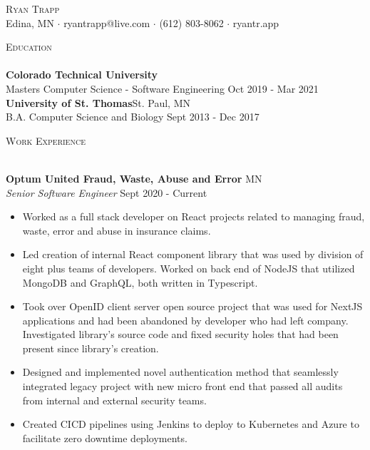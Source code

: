 \documentclass[a4paper]{article}
\newcommand{\lineunder} {
    \vspace*{-8pt} \\
    \hspace*{-18pt} \hrulefill \\
}
\newcommand{\header} [1] {
    {\hspace*{-18pt}\vspace*{6pt} \textsc{#1}}
    \vspace*{-6pt} \lineunder
}
\begin{document}
\vspace*{-40pt}

    

\vspace*{-10pt}
\begin{center}
	{\Huge \scshape {Ryan Trapp}}\\
	Edina, MN $\cdot$ ryantrapp@live.com $\cdot$ (612) 803-8062 $\cdot$ ryantr.app\\
\end{center}

\header{Education}
\textbf{Colorado Technical University}\\
Masters Computer Science - Software Engineering \hfill Oct 2019 - Mar 2021\\
\vspace{2mm}
\textbf{University of St. Thomas}\hfill St. Paul, MN\\
B.A. Computer Science and Biology \hfill Sept 2013 - Dec 2017\\
\vspace{2mm}

\header{Work Experience}
\vspace{1mm}

\textbf{Optum United Fraud, Waste, Abuse and Error} \hfill MN\\
\textit{Senior Software Engineer} \hfill Sept 2020 - Current\\
\vspace{-1mm}
\begin{itemize} \itemsep 1pt
	\item Worked as a full stack developer on React projects related to managing fraud, waste, error and abuse in insurance claims.
	\item Led creation of internal React component library that was used by division of eight plus teams of developers. Worked on back end of NodeJS that utilized MongoDB and GraphQL, both written in Typescript.
	\item Took over OpenID client server open source project that was used for NextJS applications and had been abandoned by developer who had left company. Investigated library's source code and fixed security holes that had been present since library's creation.
	\item Designed and implemented novel authentication method that seamlessly integrated legacy project with new micro front end that passed all audits from internal and external security teams.
	\item Created CICD pipelines using Jenkins to deploy to Kubernetes and Azure to facilitate zero downtime deployments.

\end{itemize}
\end{document}
